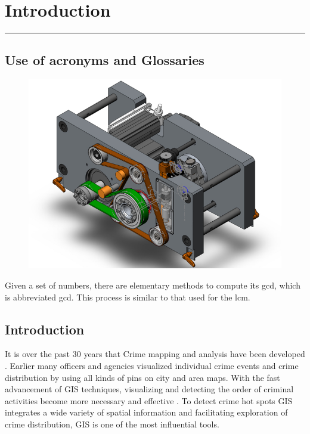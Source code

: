 \chapter{Introduction}\hrule
\label{Chapter:1}

\section{Use of acronyms and Glossaries}

\begin{figure}
\centering
\includegraphics[width=0.7\linewidth]{./images/HCutter640}
\caption{}
\label{fig:HCutter640}
\end{figure}

Given a set of numbers, there are elementary methods to compute 
its \acrlong{gcd}, which is abbreviated \acrshort{gcd}. This 
process is similar to that used for the \acrfull{lcm}.
\section{Introduction}
It is over the past 30 years that Crime mapping and analysis have been developed \citep{Ansar2003}. Earlier many officers and agencies visualized individual crime events and crime distribution by using all kinds of pins on city and area maps. With the fast advancement of GIS techniques, visualizing and detecting the order of criminal activities become more necessary and effective \citep{Shannon1949}. To detect crime hot spots GIS integrates a wide variety of spatial information and facilitating exploration of crime distribution, GIS is one of the most influential tools.

